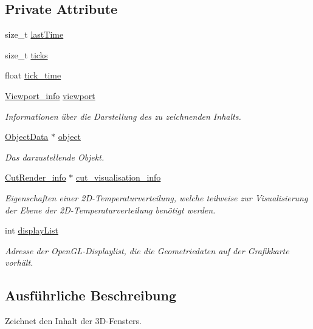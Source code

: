 \subsection*{Private Attribute}
\begin{DoxyCompactItemize}
\item 
size\-\_\-t \hyperlink{classRenderer_aab05ebe51ff8677cce3019aa1f4236b1}{last\-Time}
\item 
size\-\_\-t \hyperlink{classRenderer_a4b7039dc3e7a9df5198267eb6ff4caa8}{ticks}
\item 
float \hyperlink{classRenderer_ae6aeda3bc0a4dc5f11d585b91cce3403}{tick\-\_\-time}
\item 
\hyperlink{structRenderer_1_1Viewport__info}{Viewport\-\_\-info} \hyperlink{classRenderer_a4428a5ef0ceaf4de5c9991a40990994d}{viewport}
\begin{DoxyCompactList}\small\item\em Informationen über die Darstellung des zu zeichnenden Inhalts. \end{DoxyCompactList}\item 
\hyperlink{classObjectData}{Object\-Data} $\ast$ \hyperlink{classRenderer_a4ad4a42fe6bfd32ff3ef4bb1d59f8f96}{object}
\begin{DoxyCompactList}\small\item\em Das darzustellende Objekt. \end{DoxyCompactList}\item 
\hyperlink{structUtils_1_1CutRender__info}{Cut\-Render\-\_\-info} $\ast$ \hyperlink{classRenderer_a119b7d1e3eb740a118e269758dd1a906}{cut\-\_\-visualisation\-\_\-info}
\begin{DoxyCompactList}\small\item\em Eigenschaften einer 2\-D-\/\-Temperaturverteilung, welche teilweise zur Visualisierung der Ebene der 2\-D-\/\-Temperaturverteilung benötigt werden. \end{DoxyCompactList}\item 
int \hyperlink{classRenderer_a165ec913fa058d0a38f5e7b7635adfd2}{display\-List}
\begin{DoxyCompactList}\small\item\em Adresse der Open\-G\-L-\/\-Displaylist, die die Geometriedaten auf der Grafikkarte vorhält. \end{DoxyCompactList}\end{DoxyCompactItemize}


\subsection{Ausführliche Beschreibung}
Zeichnet den Inhalt der 3\-D-\/\-Fensters. 

